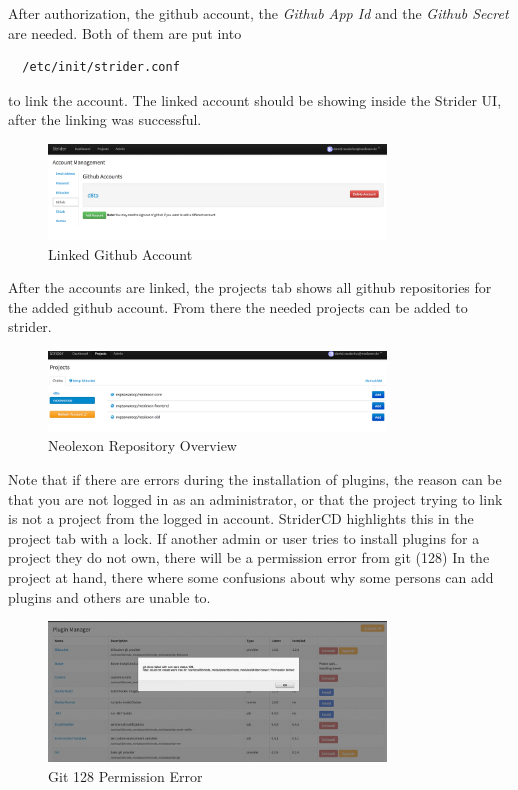 After authorization, the github account, the \textit{Github App Id} and the \textit{Github Secret} are needed. Both of them are put
into

\begin{lstlisting}
  /etc/init/strider.conf
\end{lstlisting}

to link the account. The linked account should be showing inside the Strider UI, after the linking was successful.

\begin{figure}[h!]
  \centering
  \includegraphics[width=0.8\textwidth]{images/linkedGithub.png}
  \caption{Linked Github Account}
\end{figure}

After the accounts are linked, the projects tab shows all github repositories for the added github account. From there the needed projects can
be added to strider.

\begin{figure}[h!]
  \centering
  \includegraphics[width=0.8\textwidth]{images/neolexonGit.png}
  \caption{Neolexon Repository Overview}
\end{figure}

Note that if there are errors during the installation of plugins, the reason can be that you are not logged in as an administrator,
or that the project trying to link is not a project from the logged in account. StriderCD highlights this in the project tab with a lock.
If another admin or user tries to install plugins for a project they do not own, there will be a permission error from git (128)
In the project at hand, there where some confusions about why some persons can add plugins and others are unable to.

\begin{figure}[h!]
  \centering
  \includegraphics[width=0.8\textwidth]{images/permissionError.png}
  \caption{Git 128 Permission Error}
\end{figure}


